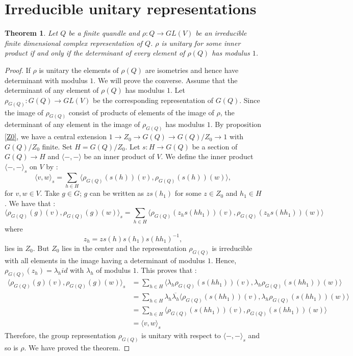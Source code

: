 \documentclass[12pt, reqno]{amsart}
\newtheorem{theorem}{Theorem}[section]
\begin{document}
\section{Irreducible unitary representations}
\begin{theorem}
Let $Q$ be a finite quandle and $\rho : Q \to GL(V)$ be an irreducible finite dimensional complex representation of $Q$. $\rho$ is unitary for some inner product if and only if the determinant of every element of $\rho(Q)$ has modulus $1$.
\end{theorem}
\begin{proof}
If $\rho$ is unitary the elements of $\rho(Q)$ are isometries and hence have determinant with modulus $1$. We will prove the converse. Assume that the determinant of any element of $\rho(Q)$ has modulus $1$. Let $\rho_{G(Q)} : G(Q) \to GL(V)$ be the corresponding representation of $G(Q)$. Since the image of $\rho_{G(Q)}$ consist of products of elements of the image of $\rho$, the determinant of any element in the image of $\rho_{G(Q)}$ has modulus $1$. By proposition \ref{Z0}, we have a central extension $1 \to Z_0 \to G(Q) \to G(Q)/Z_0\to 1$ with $G(Q)/Z_0$ finite. Set $H=G(Q)/Z_0$. Let $s:H\to G(Q)$ be a section of $G(Q)\to H$ and $\langle-,-\rangle$ be an inner product of $V$. We define the inner product $\langle -,-\rangle_s$ on $V$ by :
$$ \langle v,w\rangle_s= \sum_{h\in H} \langle \rho_{G(Q)}(s(h))(v), \rho_{G(Q)}(s(h))(w)\rangle,$$
for $v,w\in V$. Take $g \in G$; $g$ can be written as $zs(h_1)$ for some $z\in Z_0$ and $h_1\in H$. We have that :
$$ \langle \rho_{G(Q)}(g)(v),\rho_{G(Q)}(g)(w)\rangle_s= \sum_{h\in H} \langle \rho_{G(Q)}(z_hs(hh_1))(v), \rho_{G(Q)}(z_hs(hh_1))(w)\rangle$$
where 
$$ z_h=zs(h)s(h_1)s(hh_1)^{-1},$$
lies in $Z_0$. But $Z_0$ lies in the center and the representation $\rho_{G(Q)}$ is irreducible with all elements in the image having a determinant of modulus $1$. Hence, $\rho_{G(Q)}(z_h)=\lambda_h id$ with $\lambda_h$ of modulus $1$. This proves that  :
\begin{equation*}
 \begin{split}
\langle \rho_{G(Q)}(g)(v),\rho_{G(Q)}(g)(w)\rangle_s  & = \sum_{h\in H} \langle \lambda_h\rho_{G(Q)}(s(hh_1))(v), \lambda_h\rho_{G(Q)}(s(hh_1))(w)\rangle\\
&=\sum_{h\in H}\lambda_h\overline{\lambda_h} \langle \rho_{G(Q)}(s(hh_1))(v), \lambda_h\rho_{G(Q)}(s(hh_1))(w)\rangle\\
&=\sum_{h\in H} \langle \rho_{G(Q)}(s(hh_1))(v), \rho_{G(Q)}(s(hh_1))(w)\rangle\\
&= \langle v,w\rangle_s
\end{split}
\end{equation*}
Therefore, the group representation $\rho_{G(Q)}$ is unitary with respect to $\langle -,-\rangle_s$ and so is $\rho$. We have proved the theorem.
\end{proof}
\end{document}

